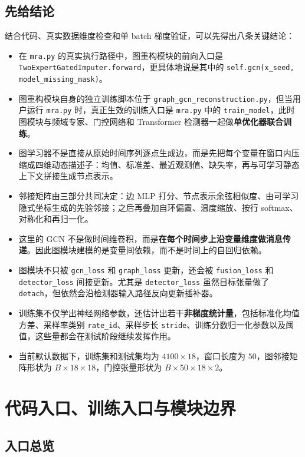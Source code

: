 \documentclass[UTF8]{ctexart}
\begin{document}
\subsection{先给结论}

结合代码、真实数据维度检查和单 batch 梯度验证，可以先得出八条关键结论：
\begin{itemize}
    \item 在 \verb|mra.py| 的真实执行路径中，图重构模块的前向入口是 \verb|TwoExpertGatedImputer.forward|，更具体地说是其中的 \verb|self.gcn(x_seed, model_missing_mask)|。
    \item 图重构模块自身的独立训练脚本位于 \verb|graph_gcn_reconstruction.py|，但当用户运行 \verb|mra.py| 时，真正生效的训练入口是 \verb|mra.py| 中的 \verb|train_model|，此时图模块与频域专家、门控网络和 Transformer 检测器一起做\textbf{单优化器联合训练}。
    \item 图学习器不是直接从原始时间序列逐点生成边，而是先把每个变量在窗口内压缩成四维动态描述子：均值、标准差、最近观测值、缺失率，再与可学习静态上下文拼接生成节点表示。
    \item 邻接矩阵由三部分共同决定：边 MLP 打分、节点表示余弦相似度、由可学习隐式坐标生成的先验邻接；之后再叠加自环偏置、温度缩放、按行 softmax、对称化和再归一化。
    \item 这里的 GCN 不是做时间维卷积，而是\textbf{在每个时间步上沿变量维度做消息传递}。因此图模块建模的是变量间依赖，而不是时间上的自回归依赖。
    \item 图模块不只被 \verb|gcn_loss| 和 \verb|graph_loss| 更新，还会被 \verb|fusion_loss| 和 \verb|detector_loss| 间接更新。尤其是 \verb|detector_loss| 虽然目标张量做了 \verb|detach|，但依然会沿检测器输入路径反向更新插补器。
    \item 训练集不仅学出神经网络参数，还估计出若干\textbf{非梯度统计量}，包括标准化均值方差、采样率类别 \verb|rate_id|、采样步长 \verb|stride|、训练分数归一化参数以及阈值，这些量都会在测试阶段继续发挥作用。
    \item 当前默认数据下，训练集和测试集均为 \(4100 \times 18\)，窗口长度为 \(50\)，图邻接矩阵形状为 \(B \times 18 \times 18\)，门控张量形状为 \(B \times 50 \times 18 \times 2\)。
\end{itemize}

\section{代码入口、训练入口与模块边界}

\subsection{入口总览}
\end{document}
